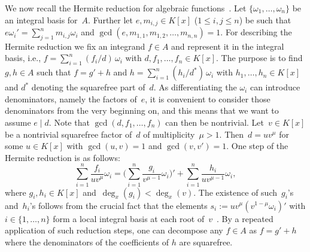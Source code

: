 \documentclass{sig-alternate}
\begin{document}
We now recall the Hermite reduction for algebraic functions~\cite{trager84,ACA1992,bronstein98}.
Let $\{\omega_1,\ldots,\omega_n\}$ be an integral basis for~$A$.
Further let $e, m_{i,j}\in K[x]$ ($1\leq i,j\leq n$) be such that
$e\omega_i'=\sum_{j=1}^n m_{i,j}\omega_i$ and
$\gcd(e,m_{1,1},m_{1,2},\ldots,m_{n,n})=1$.
For describing the Hermite reduction we fix an integrand $f\in A$ and represent it in the
integral basis, i.e., $f=\sum_{i=1}^n (f_i/d)\,\omega_i$ with
$d,f_1,\ldots,f_n\in K[x]$. The purpose is to find $g, h\in A$ such that
$f=g' + h$ and $h=\sum_{i=1}^n(h_i/d^\ast)\,\omega_i$ with $h_1,\ldots,h_n\in K[x]$
and $d^\ast$ denoting the squarefree part of~$d$.
As differentiating the $\omega_i$ can introduce
denominators, name\-ly the factors of~$e$, it is convenient to consider those
denominators from the very beginning on, and this means that we want to assume
$e\mid d$. Note that $\gcd(d,f_1,\ldots,f_n)$ can then be nontrivial.
Let~$v\in K[x]$ be a nontrivial squarefree factor of~$d$ of multiplicity~$\mu>1$.
Then~$d = uv^\mu$ for some $u\in K[x]$ with $\gcd(u, v)=1$ and $\gcd(v,v')=1$.
One step of the Hermite reduction is as follows:
\begin{equation}\label{eq:hred}
  \sum_{i=1}^n \frac{f_i}{uv^\mu}\omega_i =
  \biggl(\sum_{i=1}^n\frac{g_i}{v^{\mu-1}}\omega_i\biggr)' +
  \sum_{i=1}^n \frac{h_i}{uv^{\mu-1}}\omega_i,
\end{equation}
where $g_i, h_i \in K[x]$ and~$\deg_x(g_i)< \deg_x(v)$.
The existence of such~$g_i$'s and~$h_i$'s follows from the crucial fact that
the elements $s_i :=  uv^\mu(v^{1-\mu}\omega_i)'$ with $i\in \{ 1, \ldots, n\}$
form a local integral basis at each root of~$v$~\cite[page 46]{trager84}.
By a repeated application of such reduction steps, one can decompose any $f\in A$
as $f=g' + h$ where the denominators of the coefficients of $h$ are squarefree.
\end{document}
